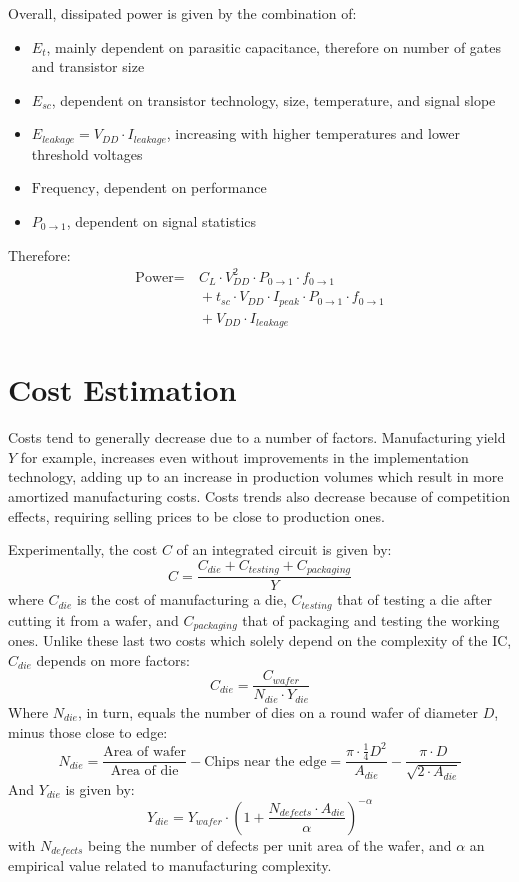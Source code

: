 Overall, dissipated power is given by the combination of:
\begin{itemize}
    \item $E_t$, mainly dependent on parasitic capacitance, therefore on number of gates and transistor size
    \item $E_{sc}$, dependent on transistor technology, size, temperature, and signal slope
    \item $E_{leakage} = V_{DD} \cdot I_{leakage}$, increasing with higher temperatures and lower threshold voltages
    \item $\textrm{Frequency}$, dependent on performance
    \item $P_{0 \rightarrow 1}$, dependent on signal statistics
\end{itemize}

Therefore:
\begin{align*}
    \textrm{Power} =&\ C_L \cdot V_{DD}^2 \cdot P_{0 \rightarrow 1} \cdot f_{0 \rightarrow 1}\\
    &\ + t_{sc} \cdot V_{DD} \cdot I_{peak} \cdot P_{0 \rightarrow 1} \cdot f_{0 \rightarrow 1}\\
    &\ + V_{DD} \cdot I_{leakage}
\end{align*}


\section{Cost Estimation}
Costs tend to generally decrease due to a number of factors. Manufacturing yield $Y$ for example, increases even without improvements in the implementation technology, adding up to an increase in production volumes which result in more amortized manufacturing costs. Costs trends also decrease because of competition effects, requiring selling prices to be close to production ones.

Experimentally, the cost $C$ of an integrated circuit is given by:
$$C=\frac{C_{die} + C_{testing} + C_{packaging}}{Y}$$
\noindent where $C_{die}$ is the cost of manufacturing a die, $C_{testing}$ that of testing a die after cutting it from a wafer, and $C_{packaging}$ that of packaging and testing the working ones. Unlike these last two costs which solely depend on the complexity of the IC, $C_{die}$ depends on more factors:
$$C_{die}=\frac{C_{wafer}}{N_{die} \cdot Y_{die}}$$
Where $N_{die}$, in turn, equals the number of dies on a round wafer of diameter $D$, minus those close to edge:
$$N_{die}=\frac{\textrm{Area of wafer}}{\textrm{Area of die}} - \textrm{Chips near the edge} = \frac{\pi \cdot \frac{1}{4} D^2}{A_{die}} - \frac{\pi \cdot D}{\sqrt{2 \cdot A_{die}}}$$
And $Y_{die}$ is given by:
$$Y_{die}=Y_{wafer} \cdot \left(1 + \frac{N_{defects} \cdot A_{die}}{\alpha}\right)^{-\alpha}$$
\noindent with $N_{defects}$ being the number of defects per unit area of the wafer, and $\alpha$ an empirical value related to manufacturing complexity.
\newline

